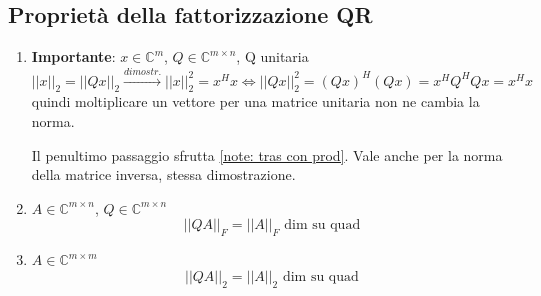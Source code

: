\documentclass[12pt,a4paper,]{report}
\begin{document}
\subsection{Proprietà della fattorizzazione QR}
\begin{enumerate}
    \item \textbf{Importante}: $x \in \mathbb{C}^m$, $Q \in \mathbb{C}^{m\times n}$, Q unitaria
    \[
    \boxed{||x||_2 = ||Qx||_2} \xrightarrow{dimostr.} ||x||_2^2 = x^H x \iff ||Qx||_2^2 = (Qx)^H(Qx) = x^H Q^H Qx = x^H x
    \]
    quindi moltiplicare un vettore per una matrice unitaria non ne cambia la norma.
    \begin{nota}
        Il penultimo passaggio sfrutta \autoref{note: tras con prod}.
        Vale anche per la norma della matrice inversa, stessa dimostrazione.
    \end{nota}
    \item $A \in \mathbb{C}^{m\times n}$, $Q \in \mathbb{C}^{m\times n}$
    \[
    ||QA||_F = ||A||_F \text{ dim su quad}
    \]
    \item $A \in \mathbb{C}^{m\times m}$
    \[
    ||QA||_2 = ||A||_2 \text{ dim su quad}
    \]
\end{enumerate}
\end{document}
